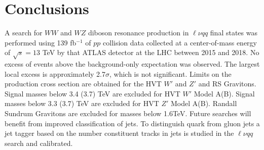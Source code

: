 \label{ch:conclusion}
\chapter{Conclusions}

A search for $WW$ and $WZ$ diboson resonance production in $\ell \nu qq $ final states was performed using 139 fb$^{-1}$ of $pp$ collision data collected at a center-of-mass energy of $\sqrt{s}=13$ TeV by that ATLAS detector at the LHC between 2015 and 2018. No excess of events above the background-only expectation was observed. The largest local excess is approximately 2.7$\sigma$, which is not significant. Limits on the production cross section are obtained for the HVT $W'$ and $Z'$ and RS Gravitons. Signal masses below 3.4 (3.7) TeV are excluded for HVT $W'$ Model A(B). Signal masses below 3.3 (3.7) TeV are excluded for HVT $Z'$ Model A(B). Randall Sundrum Gravitons are excluded for masses below 1.6TeV. Future searches will benefit from improved classification of jets. To distinguish quark from gluon jets a jet tagger based on the number constituent tracks in jets is studied in the $\ell \nu qq$ search and calibrated.